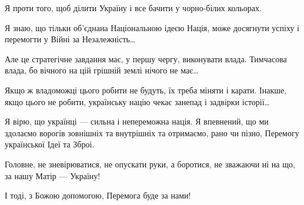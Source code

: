 Я проти того, щоб ділити Україну і все бачити у чорно-білих кольорах.

Я знаю, що тільки об’єднана Національною ідеєю Нація, може досягнути успіху і
перемогти у Війні за Незалежність…

Але це стратегічне завдання має, у першу чергу, виконувати влада. Тимчасова
влада, бо вічного на цій грішній землі нічого не має…

Якщо ж владоможці цього робити не будуть, їх треба міняти і карати. Інакше,
якщо цього не робити, українську націю чекає занепад і задвірки історії…

Я вірю, що українці — сильна і непереможна нація. Я впевнений, що ми здолаємо
ворогів зовнішніх та внутрішніх та отримаємо, рано чи пізно, Перемогу
української Ідеї та Зброі.

Головне, не зневірюватися, не опускати руки, а боротися, не зважаючи ні на що,
за нашу Матір — Україну!

І тоді, з Божою допомогою, Перемога буде за нами!
